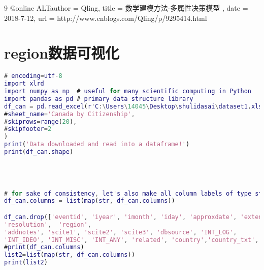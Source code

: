 \documentclass{cumcmthesis}
\begin{document}
\begin{thebibliography}{9}%
  @online{
 	ALTauthor = {Qling},
 	title = {数学建模方法-多属性决策模型 },
 	date = {2018-7-12},
 	url = {http://www.cnblogs.com/Qling/p/9295414.html}
 }
\end{thebibliography}

\newpage
\appendix
\section{region数据可视化}
\begin{lstlisting}[language=matlab]
# encoding=utf-8
import xlrd
import numpy as np  # useful for many scientific computing in Python
import pandas as pd # primary data structure library
df_can = pd.read_excel(r'C:\Users\14045\Desktop\shulidasai\dataset1.xlsx',
#sheet_name='Canada by Citizenship',
#skiprows=range(20),
#skipfooter=2
)
print('Data downloaded and read into a dataframe!')
print(df_can.shape)




# for sake of consistency, let's also make all column labels of type string
df_can.columns = list(map(str, df_can.columns))

df_can.drop(['eventid', 'iyear', 'imonth', 'iday', 'approxdate', 'extended',
'resolution',  'region',
'addnotes', 'scite1', 'scite2', 'scite3', 'dbsource', 'INT_LOG',
'INT_IDEO', 'INT_MISC', 'INT_ANY', 'related', 'country','country_txt', 'provstate', 'city', 'latitude', 'longitude', 'specificity', 'vicinity', 'location', 'summary', 'crit1', 'crit2', 'crit3', 'doubtterr', 'alternative', 'alternative_txt', 'multiple', 'success', 'suicide', 'attacktype1', 'attacktype1_txt', 'attacktype2', 'attacktype2_txt', 'attacktype3', 'attacktype3_txt', 'targtype1', 'targtype1_txt', 'targsubtype1', 'targsubtype1_txt', 'corp1', 'target1', 'natlty1', 'natlty1_txt', 'targtype2', 'targtype2_txt', 'targsubtype2', 'targsubtype2_txt', 'corp2', 'target2', 'natlty2', 'natlty2_txt', 'targtype3', 'targtype3_txt', 'targsubtype3', 'targsubtype3_txt', 'corp3', 'target3', 'natlty3', 'natlty3_txt', 'gname', 'gsubname', 'gname2', 'gsubname2', 'gname3', 'gsubname3', 'motive', 'guncertain1', 'guncertain2', 'guncertain3', 'individual', 'nperps', 'nperpcap', 'claimed', 'claimmode', 'claimmode_txt', 'claim2', 'claimmode2', 'claimmode2_txt', 'claim3', 'claimmode3', 'claimmode3_txt', 'compclaim', 'weaptype1', 'weaptype1_txt', 'weapsubtype1', 'weapsubtype1_txt', 'weaptype2', 'weaptype2_txt', 'weapsubtype2', 'weapsubtype2_txt', 'weaptype3', 'weaptype3_txt', 'weapsubtype3', 'weapsubtype3_txt', 'weaptype4', 'weaptype4_txt', 'weapsubtype4', 'weapsubtype4_txt', 'weapdetail', 'nkill', 'nkillus', 'nkillter', 'nwound', 'nwoundus', 'nwoundte', 'property', 'propextent', 'propextent_txt', 'propvalue', 'propcomment', 'ishostkid', 'nhostkid', 'nhostkidus', 'nhours', 'ndays', 'divert', 'kidhijcountry', 'ransom', 'ransomamt', 'ransomamtus', 'ransompaid', 'ransompaidus', 'ransomnote', 'hostkidoutcome', 'hostkidoutcome_txt', 'nreleased'], axis=1, inplace=True)
#print(df_can.columns)
list2=list(map(str, df_can.columns))
print(list2)



\end{lstlisting}
\end{document}
